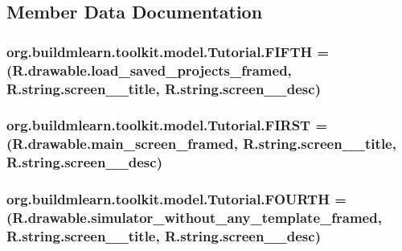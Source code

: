 \subsection{Member Data Documentation}
\hypertarget{enumorg_1_1buildmlearn_1_1toolkit_1_1model_1_1Tutorial_abdd038e81834331bf33408c731685847}{
\subsubsection[{F\-I\-F\-T\-H}]{\setlength{\rightskip}{0pt plus 5cm}org.\-buildmlearn.\-toolkit.\-model.\-Tutorial.\-F\-I\-F\-T\-H =(R.\-drawable.\-load\-\_\-saved\-\_\-projects\-\_\-framed, R.\-string.\-screen\-\_\-\_\-title, R.\-string.\-screen\-\_\-\_\-desc)}}\label{enumorg_1_1buildmlearn_1_1toolkit_1_1model_1_1Tutorial_abdd038e81834331bf33408c731685847}
\hypertarget{enumorg_1_1buildmlearn_1_1toolkit_1_1model_1_1Tutorial_a3b1a4ca35bbdcc35c2d6d7a1c2e87c2a}{
\subsubsection[{F\-I\-R\-S\-T}]{\setlength{\rightskip}{0pt plus 5cm}org.\-buildmlearn.\-toolkit.\-model.\-Tutorial.\-F\-I\-R\-S\-T =(R.\-drawable.\-main\-\_\-screen\-\_\-framed, R.\-string.\-screen\-\_\-\_\-title, R.\-string.\-screen\-\_\-\_\-desc)}}\label{enumorg_1_1buildmlearn_1_1toolkit_1_1model_1_1Tutorial_a3b1a4ca35bbdcc35c2d6d7a1c2e87c2a}
\hypertarget{enumorg_1_1buildmlearn_1_1toolkit_1_1model_1_1Tutorial_ae4478d769431a5f34a6698ca0712ff8f}{
\subsubsection[{F\-O\-U\-R\-T\-H}]{\setlength{\rightskip}{0pt plus 5cm}org.\-buildmlearn.\-toolkit.\-model.\-Tutorial.\-F\-O\-U\-R\-T\-H =(R.\-drawable.\-simulator\-\_\-without\-\_\-any\-\_\-template\-\_\-framed, R.\-string.\-screen\-\_\-\_\-title, R.\-string.\-screen\-\_\-\_\-desc)}}\label{enumorg_1_1buildmlearn_1_1toolkit_1_1model_1_1Tutorial_ae4478d769431a5f34a6698ca0712ff8f}
